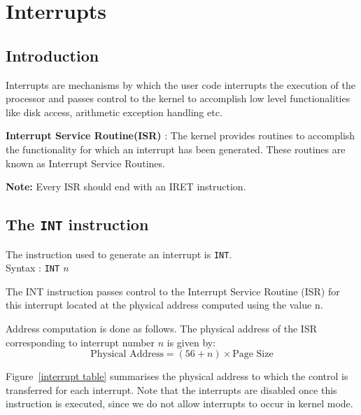 \chapter{Interrupts}
\label{chp:int}
\label{lbl:int}

\section{Introduction}
Interrupts are mechanisms by which the user code interrupts the execution of the processor and passes control to the kernel to accomplish low level functionalities like disk access, arithmetic exception handling etc.

\textbf{Interrupt Service Routine(ISR)} : The kernel provides routines to accomplish the functionality for which an interrupt has been generated. These routines are known as Interrupt Service Routines. 

\textbf{Note: } Every ISR should end with an IRET instruction.

\section{The \texttt{INT} instruction}
\label{interrupts}
The instruction used to generate an interrupt is \texttt{INT}. \\ Syntax : \texttt{INT} \emph{n} 

The INT instruction passes control to the Interrupt Service Routine (ISR) for this interrupt located at the physical address 
computed using the value n.

Address computation is done as follows. 
The physical address of the ISR corresponding to interrupt number $n$ is given by:
\begin{equation*} 
\mbox{Physical Address} = (56+n) \times \mbox{Page Size}
\end{equation*}

Figure~\ref{interrupt table} summarises the physical address to which the control is transferred for each interrupt. Note that the interrupts are disabled once this instruction is executed, since we do not allow interrupts to occur in kernel mode.

